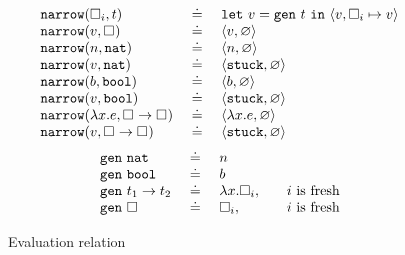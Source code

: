 \begin{figure}
$$
\begin{array}{lcl}
\mathtt{narrow}(\square_{i}, t) & \ \doteq\  & \mathtt{let}\ v = \mathtt{gen}\ t\ \mathtt{in}\ \langle v, \square_{i} \mapsto v \rangle \\
\mathtt{narrow}(v, \square_{})  & \ \doteq\  & \langle v, \varnothing \rangle \\
\mathtt{narrow}(n, \mathtt{nat})    & \ \doteq\  & \langle n, \varnothing \rangle \\
\mathtt{narrow}(v, \mathtt{nat})    & \ \doteq\  & \langle \mathtt{stuck}, \varnothing \rangle \\
\mathtt{narrow}(b, \mathtt{bool})   & \ \doteq\  & \langle b, \varnothing \rangle \\
\mathtt{narrow}(v, \mathtt{bool})   & \ \doteq\  & \langle \mathtt{stuck}, \varnothing \rangle \\
\mathtt{narrow}(\lambda x. e, {\square_{}} \rightarrow \square_{}) & \ \doteq\  & \langle \lambda x. e, \varnothing \rangle \\
\mathtt{narrow}(v, {\square_{}} \rightarrow \square_{}) & \ \doteq\  & \langle \mathtt{stuck}, \varnothing \rangle \\
\end{array}
$$
$$
\begin{array}{lcll}
\mathtt{gen}\ \mathtt{nat}   & \ \doteq\  & n & \\
\mathtt{gen}\ \mathtt{bool}  & \ \doteq\  & b & \\
\mathtt{gen}\ {t_1} \rightarrow t_2 & \ \doteq\  & \lambda x. \square_{i}, & \quad \text{$i$ is fresh} \\
\mathtt{gen}\ \square_{} & \ \doteq\  & \square_{i}, & \quad \text{$i$ is fresh} \\
\end{array}
$$


\caption{Evaluation relation}
\label{fig:operational}
\end{figure}
